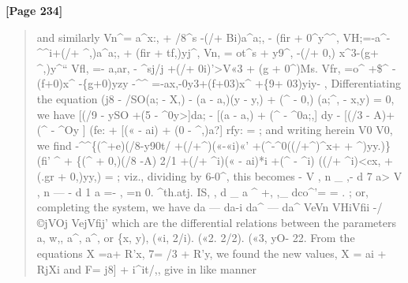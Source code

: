 \documentclass[11pt,a4paper]{book}
\begin{document}
\textbf{[Page 234]}\\[0.2cm]
\begin{quote}
and similarly
Vn\textasciicircum{}= a\textasciicircum{}x:, + /8\textasciicircum{}s -(/+ Bi)a\textasciicircum{}a;, - (fir + 0\textasciicircum{}y\textasciicircum{}\textasciicircum{}, VH;=-a\textasciicircum{}-\textasciicircum{}\textasciicircum{}i+(/+ \textasciicircum{},)a\textasciicircum{}a;, + (fir + tf,)yj\textasciicircum{},
Vn, = ot\textasciicircum{}s + y9\textasciicircum{}, -(/+ 0,) x\textasciicircum{}3-(g+ \textasciicircum{},)y\textasciicircum{}`` Vfl, =- a,ar, - \textasciicircum{}sj/j +(/+ 0i)'>V«3 + (g + 0\textasciicircum{})Ms.
Vfr, =o\textasciicircum{} +\$\textasciicircum{} -(f+0)x\textasciicircum{} -\{g+0)yzy -\textasciicircum{}\textasciicircum{} =-ax,-0y3+(f+03)x\textasciicircum{} +\{9+ 03)yiy-
,
Differentiating the equation
(j8 - /SO(a; - X,) - (a - a,)(y - y,) + (\textasciicircum{} - 0,) (a;\textasciicircum{}, - x,y) = 0,
we have
[(/9 - ySO +(5 - \textasciicircum{}0y>]da; - [(a - a,) + (\textasciicircum{} - \textasciicircum{}0a;,] dy
- [(/3 - A)+ (\textasciicircum{} - \textasciicircum{}Oy ] (fe: + [(« - ai) + (0 - \textasciicircum{},)a?] rfy: = ;
and writing herein
V0 V0,
we find
-\textasciicircum{}\textasciicircum{}\{(\textasciicircum{}+e)(/8-y90t/ +(/+\textasciicircum{})(«-«i)«' +(\textasciicircum{}-\textasciicircum{}0((/+\textasciicircum{})\textasciicircum{}x+ + \textasciicircum{})yy.)\}
(fi'
\textasciicircum{}
+ \{(\textasciicircum{} + 0,)(/8 -A) 2/1 +(/+ \textasciicircum{}i)(« - ai)*i +(\textasciicircum{} - \textasciicircum{}i) ((/+ \textasciicircum{}i)<cx, + (.gr + 0,)yy,) = ;
viz., dividing by 6-0\textasciicircum{}, this becomes
- V , n \_ ,- d 7 a> V , n --- - d 1 a =- , =n 0. \textasciicircum{}th.atj. IS, , d \_ a \textasciicircum{} +, ,\_ dco\textasciicircum{}'= = . ;
or, completing the system, we have
da --- da-i da\textasciicircum{} --- da\textasciicircum{}
VeVn
VHiVfii -/©jVOj VejVfij'
which are the differential relations between the parameters a, w,, a\textasciicircum{}, a\textasciicircum{}, or \{x, y),
(«i, 2/i). («2. 2/2). («3, yO-
22. From the equations X =a+ R'x, 7= /3 + R'y, we found
the new values, X = ai + RjXi and F= j8] + i\textasciicircum{}it/,, give in like manner
\end{quote}
\end{document}
